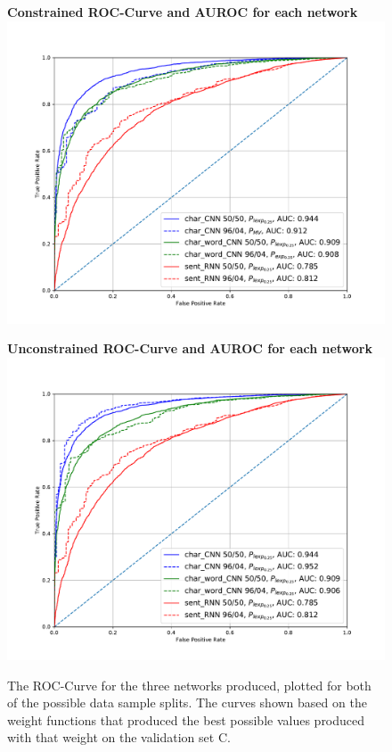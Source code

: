 \begin{figure}
    \centering
    \begin{minipage}{.5\textwidth}
        \centering
        \textbf{Constrained ROC-Curve and AUROC for each network}
        \includegraphics[width=1\linewidth]{./pictures/discussion/AUROC_Constrained}
    \end{minipage}%
    \begin{minipage}{.5\textwidth}
        \centering
        \textbf{Unconstrained ROC-Curve and AUROC for each network}
        \includegraphics[width=1\linewidth]{./pictures/discussion/AUROC_Unconstrained}
    \end{minipage}
    \caption{The ROC-Curve for the three networks produced, plotted for both of
        the possible data sample splits. The curves shown based on the weight
        functions that produced the best possible values produced with that
        weight on the validation set \gls{C}.}
    \label{fig:AUROC}
\end{figure}

